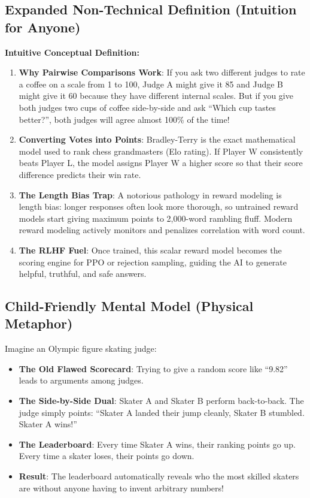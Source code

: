 \documentclass[11pt,a4paper]{article}
\theoremstyle{definition}
\begin{document}
\subsection{Expanded Non-Technical Definition (Intuition for Anyone)}
\textbf{Intuitive Conceptual Definition:}
\begin{enumerate}
    \item \textbf{Why Pairwise Comparisons Work}: If you ask two different judges to rate a coffee on a scale from 1 to 100, Judge A might give it 85 and Judge B might give it 60 because they have different internal scales. But if you give both judges two cups of coffee side-by-side and ask ``Which cup tastes better?'', both judges will agree almost 100\% of the time!
    \item \textbf{Converting Votes into Points}: Bradley-Terry is the exact mathematical model used to rank chess grandmasters (Elo rating). If Player W consistently beats Player L, the model assigns Player W a higher score so that their score difference predicts their win rate.
    \item \textbf{The Length Bias Trap}: A notorious pathology in reward modeling is length bias: longer responses often look more thorough, so untrained reward models start giving maximum points to 2,000-word rambling fluff. Modern reward modeling actively monitors and penalizes correlation with word count.
    \item \textbf{The RLHF Fuel}: Once trained, this scalar reward model becomes the scoring engine for PPO or rejection sampling, guiding the AI to generate helpful, truthful, and safe answers.
\end{enumerate}

\subsection{Child-Friendly Mental Model (Physical Metaphor)}
Imagine an Olympic figure skating judge:
\begin{itemize}
    \item \textbf{The Old Flawed Scorecard}: Trying to give a random score like ``9.82'' leads to arguments among judges.
    \item \textbf{The Side-by-Side Dual}: Skater A and Skater B perform back-to-back. The judge simply points: ``Skater A landed their jump cleanly, Skater B stumbled. Skater A wins!''
    \item \textbf{The Leaderboard}: Every time Skater A wins, their ranking points go up. Every time a skater loses, their points go down.
    \item \textbf{Result}: The leaderboard automatically reveals who the most skilled skaters are without anyone having to invent arbitrary numbers!
\end{itemize}
\end{document}
